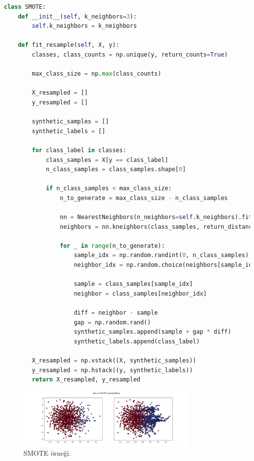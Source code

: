 \begin{lstlisting}[language=Python]
class SMOTE:
    def __init__(self, k_neighbors=3):
        self.k_neighbors = k_neighbors

    def fit_resample(self, X, y):
        classes, class_counts = np.unique(y, return_counts=True)

        max_class_size = np.max(class_counts)
        
        X_resampled = []
        y_resampled = []

        synthetic_samples = []
        synthetic_labels = []
        
        for class_label in classes:
            class_samples = X[y == class_label]
            n_class_samples = class_samples.shape[0]

            if n_class_samples < max_class_size:
                n_to_generate = max_class_size - n_class_samples

                nn = NearestNeighbors(n_neighbors=self.k_neighbors).fit(class_samples)
                neighbors = nn.kneighbors(class_samples, return_distance=False)
                
                for _ in range(n_to_generate):
                    sample_idx = np.random.randint(0, n_class_samples)
                    neighbor_idx = np.random.choice(neighbors[sample_idx][1:])
        
                    sample = class_samples[sample_idx]
                    neighbor = class_samples[neighbor_idx]
        
                    diff = neighbor - sample
                    gap = np.random.rand()
                    synthetic_samples.append(sample + gap * diff)
                    synthetic_labels.append(class_label)

        X_resampled = np.vstack((X, synthetic_samples))
        y_resampled = np.hstack((y, synthetic_labels))
        return X_resampled, y_resampled
\end{lstlisting}

\begin{figure}[h]
    \centering
    \includegraphics[width=0.8\textwidth]{images/Raw vs SMOTE oversampling.png}
    \caption{SMOTE örneği.}
    \label{fig:enter-label}
\end{figure}

